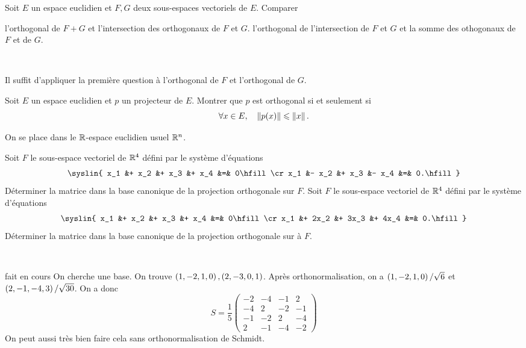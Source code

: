 \documentclass{magnolia}
\begin{document}

Soit $E$ un espace euclidien et $F,G$ deux sous-espaces vectoriels de $E$.
Comparer
\begin{questions}
\question l'orthogonal de $F+G$ et l'intersection des orthogonaux de $F$ et
  $G$.
\question l'orthogonal de l'intersection de $F$ et $G$ et la somme des
  othogonaux de $F$ et de $G$.
\end{questions}
\begin{sol}
$\quad$
\begin{questions}
\question
\question Il suffit d'appliquer la première question à l'orthogonal de $F$ et
  l'orthogonal de $G$.
\end{questions}
\end{sol}



Soit $E$ un espace euclidien et $p$ un projecteur de $E$. Montrer que $p$ est orthogonal si et seulement si
\[\forall x\in E ,\quad \left\|p(x)\right\|\leqslant\left\|x\right\|.\]


On se place dans le $\mathbb{R}$-espace euclidien usuel $\mathbb{R}^n$.
\begin{questions}
\question Soit $F$ le
  sous-espace vectoriel de $\mathbb{R}^4$ défini par le système d'équations
  $$\syslin{
  x_1 &+ x_2 &+ x_3 &+ x_4 &=& 0\hfill\cr
  x_1 &- x_2 &+ x_3 &- x_4 &=& 0.\hfill}
  $$
  Déterminer la matrice dans la base canonique de la projection
  orthogonale sur $F$.
\question Soit $F$ le
  sous-espace vectoriel de $\mathbb{R}^4$ défini par le système d'équations
  $$
  \syslin{
  x_1 &+ x_2  &+ x_3  &+ x_4  &=& 0\hfill\cr
  x_1 &+ 2x_2 &+ 3x_3 &+ 4x_4 &=& 0.\hfill}
  $$
  Déterminer la matrice dans la base canonique de la projection
  orthogonale sur à $F$.
\end{questions}
\begin{sol}
$\quad$
\begin{questions}
\question fait en cours
\question On cherche une base. On trouve $\left(1,-2,1,0\right),\left(2,-3,0,1\right)$.
  Après orthonormalisation, on a $\left(1,-2,1,0\right)/\sqrt{6}$ et
  $\left(2,-1,-4,3\right)/\sqrt{30}$. On a donc
  \[S=\frac{1}{5}\begin{pmatrix}
      -2 & -4 & -1 & 2\\
      -4 & 2 & -2 & -1\\
      -1 & -2 & 2 & -4\\
      2 & -1 & -4 & -2
      \end{pmatrix}\]
  On peut aussi très bien faire cela sans orthonormalisation de Schmidt.
\end{questions}
\end{sol}
\end{document}
